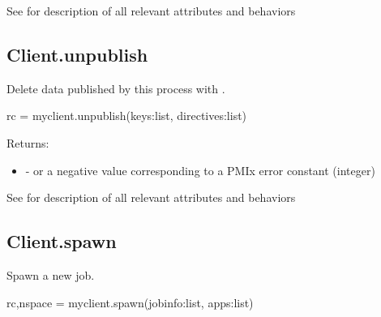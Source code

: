See  for description of all relevant attributes and behaviors


\subsection{Client.unpublish}

\summary

Delete data published by this process with .

\format

\pyspecificstart
\begin{codepar}
rc = myclient.unpublish(keys:list, directives:list)
\end{codepar}
\pyspecificend

\begin{arglist}
\end{arglist}

Returns:

\begin{itemize}
    \item {} -  or a negative value corresponding to a PMIx error constant (integer)
\end{itemize}


See  for description of all relevant attributes and behaviors


\subsection{Client.spawn}

\summary

Spawn a new job.

\format

\pyspecificstart
\begin{codepar}
rc,nspace = myclient.spawn(jobinfo:list, apps:list)
\end{codepar}
\pyspecificend

\begin{arglist}
\end{arglist}

